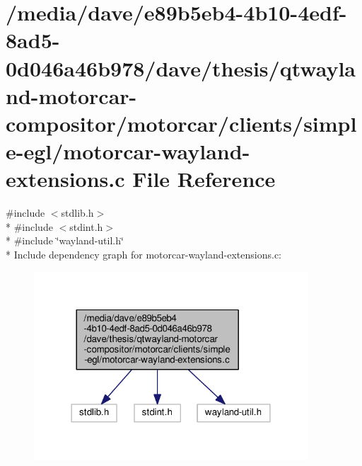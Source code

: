 \hypertarget{clients_2simple-egl_2motorcar-wayland-extensions_8c}{\section{/media/dave/e89b5eb4-\/4b10-\/4edf-\/8ad5-\/0d046a46b978/dave/thesis/qtwayland-\/motorcar-\/compositor/motorcar/clients/simple-\/egl/motorcar-\/wayland-\/extensions.c File Reference}
\label{clients_2simple-egl_2motorcar-wayland-extensions_8c}
}
{\ttfamily \#include $<$stdlib.\-h$>$}\\*
{\ttfamily \#include $<$stdint.\-h$>$}\\*
{\ttfamily \#include \char`\"{}wayland-\/util.\-h\char`\"{}}\\*
Include dependency graph for motorcar-\/wayland-\/extensions.c\-:\nopagebreak
\begin{figure}[H]
\begin{center}
\leavevmode
\includegraphics[width=290pt]{clients_2simple-egl_2motorcar-wayland-extensions_8c__incl}
\end{center}
\end{figure}

